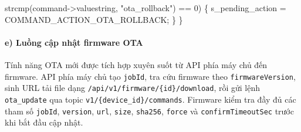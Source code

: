 \documentclass[a4paper]{extarticle}
\newenvironment{Shaded}{}{}
\newcommand{\DecValTok}[1]{\textcolor[rgb]{0.25,0.63,0.44}{#1}}
\newcommand{\NormalTok}[1]{#1}
\newcommand{\OperatorTok}[1]{\textcolor[rgb]{0.40,0.40,0.40}{#1}}
\newcommand{\StringTok}[1]{\textcolor[rgb]{0.25,0.44,0.63}{#1}}
\begin{document}
\begin{Shaded}
\begin{Highlighting}[]
\NormalTok{               strcmp}\OperatorTok{(}\NormalTok{command}\OperatorTok{{-}\textgreater{}}\NormalTok{valuestring}\OperatorTok{,} \StringTok{"ota\_rollback"}\OperatorTok{)} \OperatorTok{==} \DecValTok{0}\OperatorTok{)} \OperatorTok{\{}
\NormalTok{        s\_pending\_action }\OperatorTok{=}\NormalTok{ COMMAND\_ACTION\_OTA\_ROLLBACK}\OperatorTok{;}
    \OperatorTok{\}}
\OperatorTok{\}}
\end{Highlighting}
\end{Shaded}

\paragraph{e) Luồng cập nhật firmware
OTA}\label{e-luux1ed3ng-cux1eadp-nhux1eadt-firmware-ota}

Tính năng OTA mới được tích hợp xuyên suốt từ API phía máy chủ đến firmware.
API phía máy chủ tạo \texttt{jobId}, tra cứu firmware theo
\texttt{firmwareVersion}, sinh URL tải file dạng
\texttt{/api/v1/firmware/\{id\}/download}, rồi gửi lệnh
\texttt{ota\_update} qua topic \texttt{v1/\{device\_id\}/commands}.
Firmware kiểm tra đầy đủ các tham số \texttt{jobId}, \texttt{version},
\texttt{url}, \texttt{size}, \texttt{sha256}, \texttt{force} và
\texttt{confirmTimeoutSec} trước khi bắt đầu cập nhật.
\end{document}
